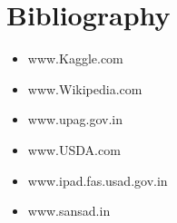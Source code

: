 \section{Bibliography }

\begin{itemize}
    \item www.Kaggle.com
    \item www.Wikipedia.com
    \item www.upag.gov.in
    \item www.USDA.com
    \item www.ipad.fas.usad.gov.in
    \item www.sansad.in
\end{itemize}
